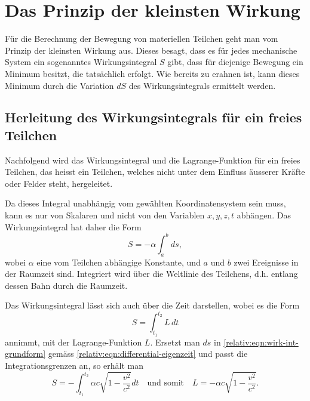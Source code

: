 
\section{Das Prinzip der kleinsten Wirkung 
\label{relativ:section:kleinste-wirkung}}

Für die Berechnung der Bewegung von materiellen Teilchen geht man
vom Prinzip der kleinsten Wirkung aus.
Dieses besagt, dass es für jedes mechanische System ein sogenanntes
Wirkungsintegral \(S\) gibt,
dass für diejenige Bewegung ein Minimum besitzt, die tatsächlich erfolgt.
Wie bereits zu erahnen ist, kann dieses Minimum durch die Variation \(dS\)
des Wirkungsintegrals ermittelt werden.

\subsection{Herleitung des Wirkungsintegrals für ein freies Teilchen 
\label{relativ:section:wirk-int-freies-teilchen}}

Nachfolgend wird das Wirkungsintegral und die Lagrange-Funktion
für ein freies Teilchen, das heisst ein Teilchen, welches nicht
unter dem Einfluss äusserer Kräfte oder Felder steht, hergeleitet.

Da dieses Integral unabhängig vom gewählten Koordinatensystem sein muss,
kann es nur von Skalaren und nicht von den Variablen \(x, y, z, t\) abhängen.
Das Wirkungsintegral hat daher die Form
\begin{equation}
    S = - \alpha \int_{a}^{b} ds,
\label{relativ:eqn:wirk-int-grundform}
\end{equation}
wobei \(\alpha\) eine vom Teilchen abhängige Konstante,
und \(a\) und \(b\) zwei Ereignisse in der Raumzeit sind.
Integriert wird über die Weltlinie des Teilchens,
d.h. entlang dessen Bahn durch die Raumzeit.

Das Wirkungsintegral lässt sich auch über die Zeit darstellen,
wobei es die Form
\begin{equation}
    S = \int_{t_1}^{t_2} L \, dt
\label{relativ:eqn:wirk-int-zeit}
\end{equation}
annimmt, mit der Lagrange-Funktion \(L\).
Ersetzt man \(ds\) in \eqref{relativ:eqn:wirk-int-grundform}
gemäss \eqref{relativ:eqn:differential-eigenzeit} und passt
die Integrationsgrenzen an, so erhält man
\begin{equation}
    S = -\int_{t_1}^{t_2} \alpha c \sqrt{1-\frac{v^2}{c^2}} dt
    \quad \text{und somit} \quad
    L = -\alpha c \sqrt{1-\frac{v^2}{c^2}}.
    \label{relativ:eq:wirk-int-lagrange}
\end{equation}

